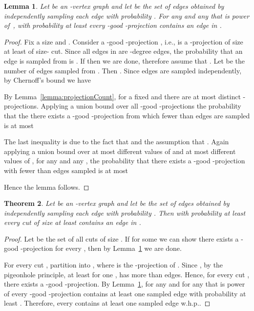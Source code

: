 \documentclass[11pt]{article}
\newtheorem{theorem}{Theorem}
\newtheorem{lemma}[theorem]{Lemma}
\begin{document}
\begin{lemma} \label{lemma:goodProjection}
  Let  be an -vertex graph and let  be the set of edges obtained by independently sampling each edge  with probability . 
  For any  and any  that is power of~, with probability at least  every -good -projection contains an edge in . 
\end{lemma}
\begin{proof}
  Fix a size  and . 
  Consider a -good -projection , i.e.,  is a -projection of size at least  of size- cut.
  Since all edges in  are -degree edges, the probability that an edge is sampled from  is .
  If  then we are done, therefore assume that . 
  Let  be the number of edges sampled from .
  Then . 
  Since edges are sampled independently, by Chernoff's bound we have 
  
  By Lemma~\ref{lemma:projectionCount}, for a fixed  and  there are at most  distinct -projections. 
  Applying a union bound over all -good -projections the probability that 
  the there exists a -good -projection from which fewer than  edges are sampled is at most 
     
  The last inequality is due to the fact that  and the assumption that . 
  Again applying a union bound over at most  different values of  and at most  different values of , for any  and any ,
  the probability that there exists a -good -projection with fewer than  edges sampled is at most 
  
  Hence the lemma follows. 
\end{proof}

\begin{theorem}\label{thm:cut} 
  Let  be an -vertex graph and let  be the set of edges obtained by independently sampling each edge  with probability . 
  Then with probability at least  every cut of size at least  contains an edge in . 
\end{theorem}
\begin{proof}
  Let  be the set of all cuts of size . 
  If for some  we can show there exists a -good -projection for every , then by Lemma~\ref{lemma:goodProjection} we are done. 

  For every cut , partition  into , where  is the -projection of .
  Since , by the pigeonhole principle, at least for one ,  has more than  edges.
  Hence, for every cut , there exists a -good -projection.  
  By Lemma~\ref{lemma:goodProjection}, for any  and for any  that is power of  every -good -projection contains at least one sampled edge with probability at least .
  Therefore, every  contains at least one sampled edge w.h.p..
\end{proof}
\end{document}
